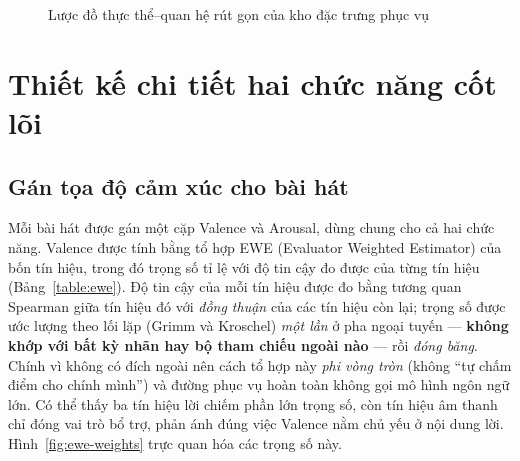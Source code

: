 \documentclass[../DoAn.tex]{subfiles}
\begin{document}
\begin{figure}[tbp]
\centering
{}
\caption{Lược đồ thực thể--quan hệ rút gọn của kho đặc trưng phục vụ}
\label{fig:erd}
\end{figure}

\section{Thiết kế chi tiết hai chức năng cốt lõi}
\label{section:4.2}

\subsection{Gán tọa độ cảm xúc cho bài hát}
\label{subsection:4.2.1}
Mỗi bài hát được gán một cặp Valence và Arousal, dùng chung cho cả hai chức năng. Valence được tính bằng tổ hợp EWE (Evaluator Weighted Estimator) \cite{grimm2005ewe} của bốn tín hiệu, trong đó trọng số tỉ lệ với độ tin cậy đo được của từng tín hiệu (Bảng~\ref{table:ewe}). Độ tin cậy của mỗi tín hiệu được đo bằng tương quan Spearman giữa tín hiệu đó với \textit{đồng thuận} của các tín hiệu còn lại; trọng số được ước lượng theo lối lặp (Grimm và Kroschel) \textit{một lần} ở pha ngoại tuyến --- \textbf{không khớp với bất kỳ nhãn hay bộ tham chiếu ngoài nào} --- rồi \textit{đóng băng}. Chính vì không có đích ngoài nên cách tổ hợp này \textit{phi vòng tròn} (không ``tự chấm điểm cho chính mình'') và đường phục vụ hoàn toàn không gọi mô hình ngôn ngữ lớn. Có thể thấy ba tín hiệu lời chiếm phần lớn trọng số, còn tín hiệu âm thanh chỉ đóng vai trò bổ trợ, phản ánh đúng việc Valence nằm chủ yếu ở nội dung lời. Hình~\ref{fig:ewe-weights} trực quan hóa các trọng số này.
\end{document}
